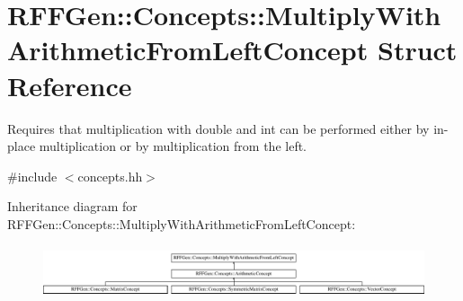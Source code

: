\hypertarget{structRFFGen_1_1Concepts_1_1MultiplyWithArithmeticFromLeftConcept}{\section{R\-F\-F\-Gen\-:\-:Concepts\-:\-:Multiply\-With\-Arithmetic\-From\-Left\-Concept Struct Reference}
\label{structRFFGen_1_1Concepts_1_1MultiplyWithArithmeticFromLeftConcept}
}


Requires that multiplication with double and int can be performed either by in-\/place multiplication or by multiplication from the left.  




{\ttfamily \#include $<$concepts.\-hh$>$}

Inheritance diagram for R\-F\-F\-Gen\-:\-:Concepts\-:\-:Multiply\-With\-Arithmetic\-From\-Left\-Concept\-:\begin{figure}[H]
\begin{center}
\leavevmode
\includegraphics[height=1.586402cm]{structRFFGen_1_1Concepts_1_1MultiplyWithArithmeticFromLeftConcept}
\end{center}
\end{figure}
